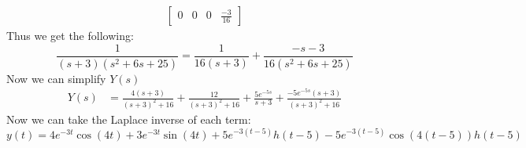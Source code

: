 \documentclass[12pt]{article}
\begin{document}
\begin{enumerate}[label = (\alph*)]
\begin{align*}
\begin{bmatrix}
		0 & 0 & 0 & \frac{-3}{16}
		\end{bmatrix}
		\end{align*}
		Thus we get the following:
		$$
		\frac{1}{(s+3)(s^2 + 6s + 25)} = \frac{1}{16(s+3)} + \frac{-s - 3}{16(s^2 + 6s + 25)}
		$$
		\newpage
		Now we can simplify $Y(s)$
		\begin{align*}
			Y(s) &= \frac{4(s+3)}{(s+3)^2 + 16} + \frac{12}{(s+3)^2 + 16} + \frac{5e^{-5s}}{s+3} + \frac{-5e^{-5s}(s+3)}{(s+3)^2 + 16}
		\end{align*}
		Now we can take the Laplace inverse of each term:
			\boldmath
			$$
			y(t) = 4e^{-3t}\cos(4t) + 3e^{-3t}\sin(4t) + 5e^{-3(t-5)}h(t-5) -5e^{-3(t-5)}\cos(4(t-5))h(t-5)
			$$
			\unboldmath
	\end{enumerate}

\newpage
\end{document}
